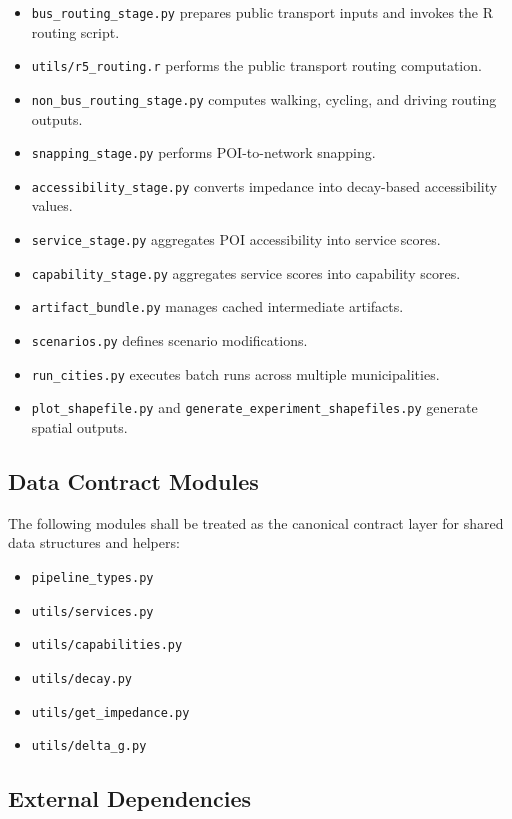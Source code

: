 \documentclass[11pt]{article}
\begin{document}
\begin{itemize}
  \item \texttt{bus\_routing\_stage.py} prepares public transport inputs and invokes the R routing script.
  \item \texttt{utils/r5\_routing.r} performs the public transport routing computation.
  \item \texttt{non\_bus\_routing\_stage.py} computes walking, cycling, and driving routing outputs.
  \item \texttt{snapping\_stage.py} performs POI-to-network snapping.
  \item \texttt{accessibility\_stage.py} converts impedance into decay-based accessibility values.
  \item \texttt{service\_stage.py} aggregates POI accessibility into service scores.
  \item \texttt{capability\_stage.py} aggregates service scores into capability scores.
  \item \texttt{artifact\_bundle.py} manages cached intermediate artifacts.
  \item \texttt{scenarios.py} defines scenario modifications.
  \item \texttt{run\_cities.py} executes batch runs across multiple municipalities.
  \item \texttt{plot\_shapefile.py} and \texttt{generate\_experiment\_shapefiles.py} generate spatial outputs.
\end{itemize}

\subsection*{Data Contract Modules}

The following modules shall be treated as the canonical contract layer for shared data structures and helpers:

\begin{itemize}
  \item \texttt{pipeline\_types.py}
  \item \texttt{utils/services.py}
  \item \texttt{utils/capabilities.py}
  \item \texttt{utils/decay.py}
  \item \texttt{utils/get\_impedance.py}
  \item \texttt{utils/delta\_g.py}
\end{itemize}

\subsection*{External Dependencies}
\end{document}
